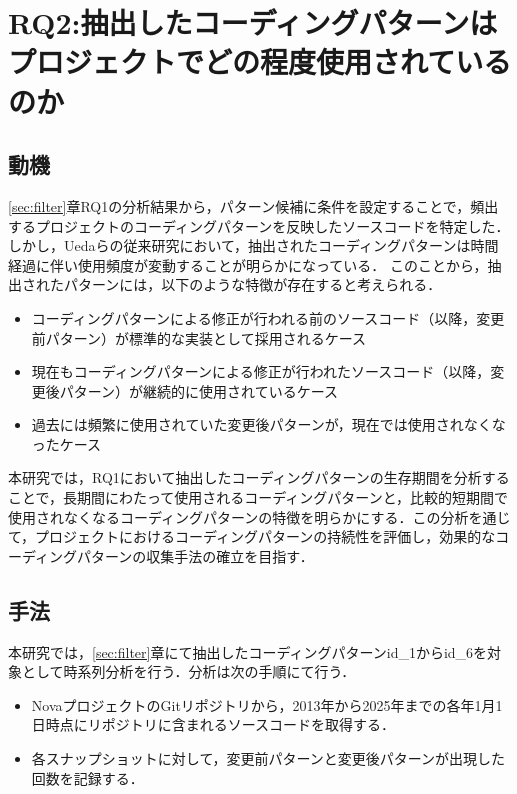 \documentclass[submit,techrep,noauthor]{ipsj}
\newcommand{\RQtwo}{抽出したコーディングパターンはプロジェクトでどの程度使用されているのか}
\begin{document}


\section{RQ2:\RQtwo}\label{sec:time}
\subsection{動機}
\ref{sec:filter}章RQ1の分析結果から，パターン候補に条件を設定することで，頻出するプロジェクトのコーディングパターンを反映したソースコードを特定した．しかし，Uedaらの従来研究\cite{devreplay}において，抽出されたコーディングパターンは時間経過に伴い使用頻度が変動することが明らかになっている．
このことから，抽出されたパターンには，以下のような特徴が存在すると考えられる．
\begin{itemize}
    \item コーディングパターンによる修正が行われる前のソースコード（以降，変更前パターン）が標準的な実装として採用されるケース
    \item 現在もコーディングパターンによる修正が行われたソースコード（以降，変更後パターン）が継続的に使用されているケース
    \item 過去には頻繁に使用されていた変更後パターンが，現在では使用されなくなったケース
\end{itemize}
本研究では，RQ1において抽出したコーディングパターンの生存期間を分析することで，長期間にわたって使用されるコーディングパターンと，比較的短期間で使用されなくなるコーディングパターンの特徴を明らかにする．この分析を通じて，プロジェクトにおけるコーディングパターンの持続性を評価し，効果的なコーディングパターンの収集手法の確立を目指す．

\subsection{手法}
本研究では，\ref{sec:filter}章にて抽出したコーディングパターンid\_1からid\_6を対象として時系列分析を行う．分析は次の手順にて行う．
\begin{itemize}
    \item NovaプロジェクトのGitリポジトリから，2013年から2025年までの各年1月1日時点にリポジトリに含まれるソースコードを取得する．
    \item 各スナップショットに対して，変更前パターンと変更後パターンが出現した回数を記録する．
\end{itemize}
\end{document}
